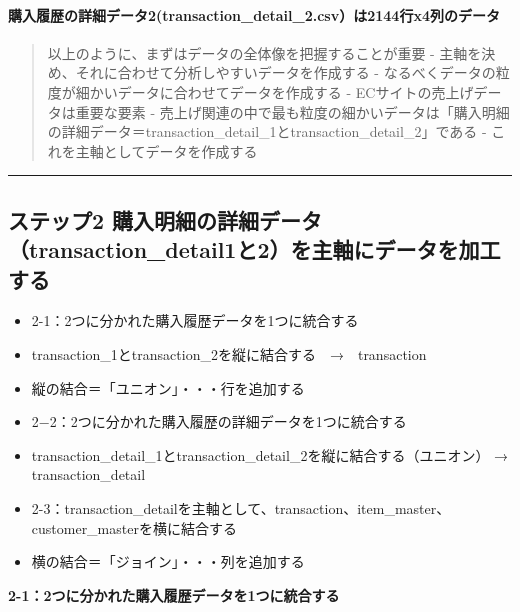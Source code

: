 \documentclass[11pt]{article}
\providecommand{\tightlist}{%
      \setlength{\itemsep}{0pt}\setlength{\parskip}{0pt}}
\begin{document}
    \paragraph{購入履歴の詳細データ2(transaction\_detail\_2.csv）は2144行x4列のデータ}\label{ux8cfcux5165ux5c65ux6b74ux306eux8a73ux7d30ux30c7ux30fcux30bf2transaction_detail_2.csvux306f2144ux884cx4ux5217ux306eux30c7ux30fcux30bf}

    \begin{quote}
以上のように、まずはデータの全体像を把握することが重要 -
主軸を決め、それに合わせて分析しやすいデータを作成する -
なるべくデータの粒度が細かいデータに合わせてデータを作成する -
ECサイトの売上げデータは重要な要素 -
売上げ関連の中で最も粒度の細かいデータは「購入明細の詳細データ＝transaction\_detail\_1とtransaction\_detail\_2」である
- これを主軸としてデータを作成する
\end{quote}

    \begin{center}\rule{0.5\linewidth}{\linethickness}\end{center}

    \subsection{ステップ2
購入明細の詳細データ（transaction\_detail1と2）を主軸にデータを加工する}\label{ux30b9ux30c6ux30c3ux30d72-ux8cfcux5165ux660eux7d30ux306eux8a73ux7d30ux30c7ux30fcux30bftransaction_detail1ux30682ux3092ux4e3bux8ef8ux306bux30c7ux30fcux30bfux3092ux52a0ux5de5ux3059ux308b}

\begin{itemize}
\tightlist
\item
  2-1：2つに分かれた購入履歴データを1つに統合する
\item
  transaction\_1とtransaction\_2を縦に結合する　→　transaction
\item
  縦の結合＝「ユニオン」・・・行を追加する
\item
  2−2：2つに分かれた購入履歴の詳細データを1つに統合する
\item
  transaction\_detail\_1とtransaction\_detail\_2を縦に結合する（ユニオン）
  → transaction\_detail
\item
  2-3：transaction\_detailを主軸として、transaction、item\_master、customer\_masterを横に結合する
\item
  横の結合＝「ジョイン」・・・列を追加する
\end{itemize}

    \textbf{2-1：2つに分かれた購入履歴データを1つに統合する}
\end{document}

